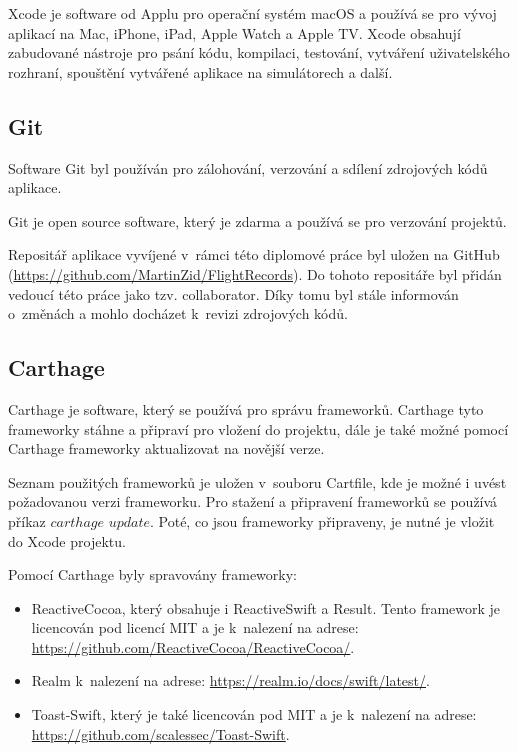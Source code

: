 \documentclass[thesis=M,czech]{FITthesis}[2012/06/26]
\begin{document}
Xcode je software od Applu pro operační systém macOS a používá se pro vývoj aplikací na Mac, iPhone, iPad, Apple Watch a Apple TV. Xcode obsahují zabudované nástroje pro psání kódu, kompilaci, testování, vytváření uživatelského rozhraní, spouštění vytvářené aplikace na simulátorech a další. \cite{Xcode}

\subsection{Git}
Software Git byl používán pro zálohování, verzování a sdílení zdrojových kódů aplikace. 

Git je open source software, který je zdarma a používá se pro verzování projektů. \cite{git}

Repositář aplikace vyvíjené v~rámci této diplomové práce byl uložen na GitHub (\url{https://github.com/MartinZid/FlightRecords}). Do tohoto repositáře byl přidán vedoucí této práce jako tzv. collaborator. Díky tomu byl stále informován o~změnách a mohlo docházet k~revizi zdrojových kódů.

\subsection{Carthage}
Carthage je software, který se používá pro správu frameworků. Carthage tyto frameworky stáhne a připraví pro vložení do projektu, dále je také možné pomocí Carthage frameworky aktualizovat na novější verze. \cite{carthage}

Seznam použitých frameworků je uložen v~souboru Cartfile, kde je možné i uvést požadovanou verzi frameworku. Pro stažení a připravení frameworků se používá příkaz $carthage$ $update$. Poté, co jsou frameworky připraveny, je nutné je vložit do Xcode projektu. \cite{carthage}

Pomocí Carthage byly spravovány frameworky:
\begin{itemize}
\item ReactiveCocoa, který obsahuje i ReactiveSwift a Result. Tento framework je licencován pod licencí MIT a je k~nalezení na adrese:\\ \url{https://github.com/ReactiveCocoa/ReactiveCocoa/}.
\item Realm k~nalezení na adrese: \url{https://realm.io/docs/swift/latest/}.
\item Toast-Swift, který je také licencován pod MIT a je k~nalezení na adrese: \url{https://github.com/scalessec/Toast-Swift}.
\end{itemize}
\end{document}
